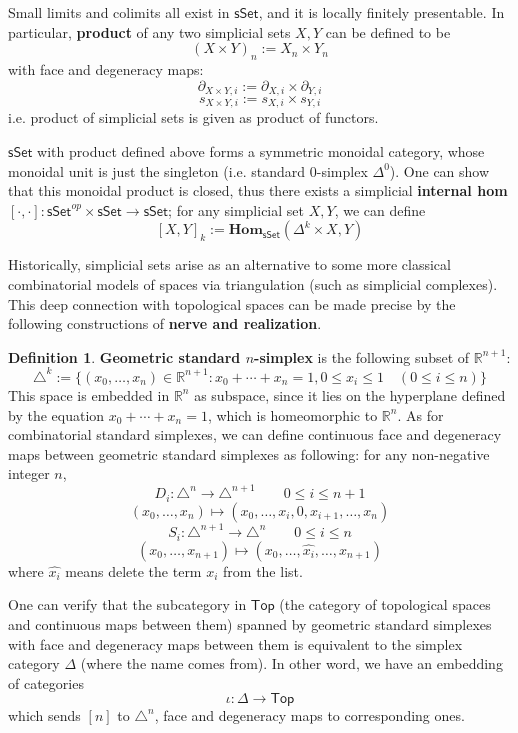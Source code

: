 \documentclass{article}
\theoremstyle{definition}
\newtheorem{mydef}{Definition}[section]
\theoremstyle{remark}
\begin{document}
Small limits and colimits all exist in $\mathsf{sSet}$, and it is locally finitely presentable. In particular, \textbf{product} of any two simplicial sets $X,Y$ can be defined to be $$(X \times Y)_n := X_n \times Y_n$$ with face and degeneracy maps: $$\partial_{X \times Y,i}:=\partial_{X,i} \times \partial_{Y,i}$$   $$s_{X \times Y,i}:=s_{X,i} \times s_{Y,i}$$ i.e. product of simplicial sets is given as product of functors.

$\mathsf{sSet}$ with product defined above forms a symmetric monoidal category, whose monoidal unit is just the singleton (i.e. standard $0$-simplex $\Delta^0$). One can show that this monoidal product is closed, thus there exists a simplicial \textbf{internal hom} $ [\cdot,\cdot]: \mathsf{sSet}^{op} \times \mathsf{sSet} \to \mathsf{sSet}$; for any simplicial set $X,Y$, we can define $$ [X,Y]_k := \mathbf{Hom}_{\mathsf{sSet}}(\Delta
^k \times X,Y)$$

Historically, simplicial sets arise as an alternative to some more classical combinatorial models of spaces via triangulation (such as simplicial complexes). This deep connection with topological spaces can be made precise by the following constructions of \textbf{nerve and realization}.

\begin{mydef}

\textbf{Geometric standard $n$-simplex} is the following subset of $\mathbb{R}^{n+1}$: $$ \triangle^k:= \{(x_0,\dots,x_n) \in \mathbb{R}^{n+1}: x_0 + \cdots + x_n = 1, 0 \leq x_i \leq 1 \quad (0 \leq i \leq n)\} $$ This space is embedded in $\mathbb{R}^n$ as subspace, since it lies on the hyperplane defined by the equation $x_0 + \cdots + x_n = 1$, which is homeomorphic to $\mathbb{R}^n$. As for combinatorial standard simplexes, we can define continuous face and degeneracy maps between geometric standard simplexes as following: for any non-negative integer $n$, $$ D_i: \triangle^n \to \triangle^{n+1} \qquad 0 \leq i \leq n+1 $$    $$ (x_0,\dots,x_n) \mapsto (x_0,\dots,x_{i},0,x_{i+1},\dots,x_n) $$    $$ S_i: \triangle^{n+1} \to \triangle^n \qquad 0 \leq i \leq n $$    $$ (x_0,\dots,x_{n+1}) \mapsto (x_0,\dots,\hat{x_{i}},\dots,x_{n+1}) $$ where $\hat{x_{i}}$ means delete the term $x_i$ from the list.

One can verify that the subcategory in $\mathsf{Top}$ (the category of topological spaces and continuous maps between them) spanned by geometric standard simplexes with face and degeneracy maps between them is equivalent to the simplex category $\Delta$ (where the name comes from). In other word, we have an embedding of categories $$ \iota: \Delta \to \mathsf{Top} $$ which sends $[n]$ to $\triangle^n$, face and degeneracy maps to corresponding ones.

\end{mydef}
\end{document}
